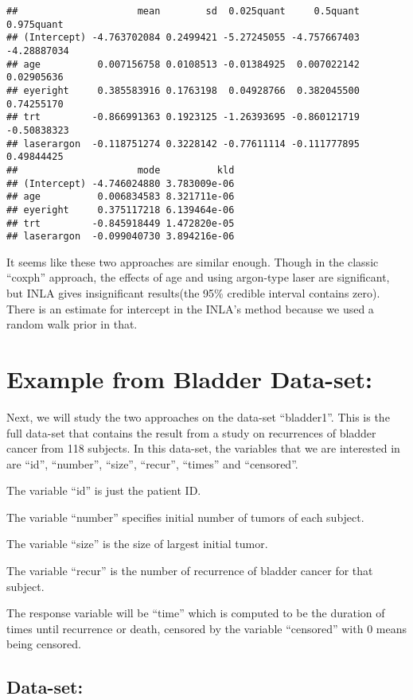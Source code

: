 \documentclass[]{article}
\begin{document}
\begin{verbatim}
##                     mean        sd  0.025quant     0.5quant  0.975quant
## (Intercept) -4.763702084 0.2499421 -5.27245055 -4.757667403 -4.28887034
## age          0.007156758 0.0108513 -0.01384925  0.007022142  0.02905636
## eyeright     0.385583916 0.1763198  0.04928766  0.382045500  0.74255170
## trt         -0.866991363 0.1923125 -1.26393695 -0.860121719 -0.50838323
## laserargon  -0.118751274 0.3228142 -0.77611114 -0.111777895  0.49844425
##                     mode          kld
## (Intercept) -4.746024880 3.783009e-06
## age          0.006834583 8.321711e-06
## eyeright     0.375117218 6.139464e-06
## trt         -0.845918449 1.472820e-05
## laserargon  -0.099040730 3.894216e-06
\end{verbatim}

It seems like these two approaches are similar enough. Though in the
classic ``coxph'' approach, the effects of age and using argon-type
laser are significant, but INLA gives insignificant results(the 95\%
credible interval contains zero). There is an estimate for intercept in
the INLA's method because we used a random walk prior in that.

\hypertarget{example-from-bladder-data-set}{%
\section{Example from Bladder
Data-set:}\label{example-from-bladder-data-set}}

Next, we will study the two approaches on the data-set ``bladder1''.
This is the full data-set that contains the result from a study on
recurrences of bladder cancer from 118 subjects. In this data-set, the
variables that we are interested in are ``id'', ``number'', ``size'',
``recur'', ``times'' and ``censored''.

The variable ``id'' is just the patient ID.

The variable ``number'' specifies initial number of tumors of each
subject.

The variable ``size'' is the size of largest initial tumor.

The variable ``recur'' is the number of recurrence of bladder cancer for
that subject.

The response variable will be ``time'' which is computed to be the
duration of times until recurrence or death, censored by the variable
``censored'' with 0 means being censored.

\hypertarget{data-set-1}{%
\subsection{Data-set:}\label{data-set-1}}
\end{document}
